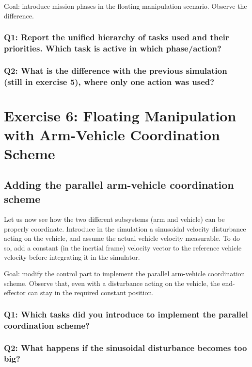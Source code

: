 \documentclass{article}
\begin{document}
Goal: introduce mission phases in the floating manipulation scenario. Observe the difference.

\subsubsection{Q1: Report the unified hierarchy of tasks used and their priorities. Which task is active in which phase/action?}

\subsubsection{Q2: What is the difference with the previous simulation (still in exercise 5), where only one action was used?}

\clearpage
\section{Exercise 6: Floating Manipulation with Arm-Vehicle Coordination Scheme}
\subsection{Adding the parallel arm-vehicle coordination scheme}
Let us now see how the two different subsystems (arm and vehicle) can be properly coordinate. Introduce in the simulation a sinusoidal velocity disturbance acting on the vehicle, and assume the actual vehicle velocity measurable. To do so, add a constant (in the inertial frame) velocity vector to the reference vehicle velocity before integrating it in the simulator. 

Goal: modify the control part to implement the parallel arm-vehicle coordination scheme. Observe that, even with a disturbance acting on the vehicle, the end-effector can stay in the required constant position.

\subsubsection{Q1: Which tasks did you introduce to implement the parallel coordination scheme?}

\subsubsection{Q2: What happens if the sinusoidal disturbance becomes too big?}



\end{document}
